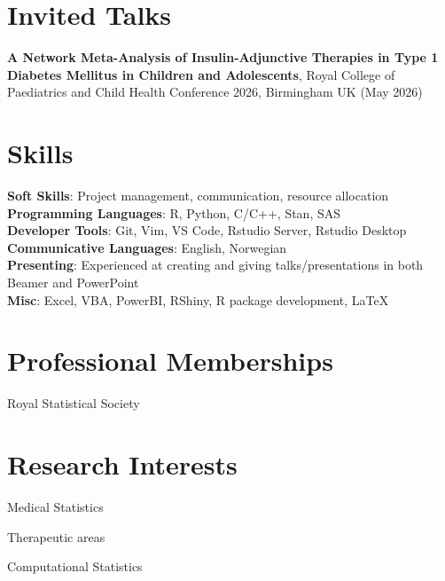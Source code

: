 \documentclass[letterpaper,11pt]{article}
\begin{document}
\section{Invited Talks}
\begin{itemize}[leftmargin=0.15in, label={}]
    \small{
      \item{\textbf{A Network Meta-Analysis of Insulin-Adjunctive Therapies in Type 1 Diabetes Mellitus in Children and Adolescents}, Royal College of Paediatrics and Child Health Conference 2026, Birmingham UK  (May 2026)}
    }
\end{itemize}

\section{Skills}
 \begin{itemize}[leftmargin=0.15in, label={}]
    \small{\item{
     \textbf{Soft Skills}{: Project management, communication, resource allocation} \\
     \textbf{Programming Languages}{: R, Python, C/C++, Stan, SAS} \\
     \textbf{Developer Tools}{: Git, Vim,  VS Code, Rstudio Server, Rstudio Desktop} \\
     \textbf{Communicative Languages}: English, Norwegian \\
     \textbf{Presenting}{: Experienced at creating and giving talks/presentations in both Beamer and PowerPoint} \\
    \textbf{Misc}{: Excel, VBA, PowerBI, RShiny, R package development, \LaTeX}
    }}
\end{itemize}

\section{Professional Memberships}
\begin{itemize}[leftmargin=0.15in, label={}]
    \small{\item Royal Statistical Society}
\end{itemize}

\section{Research Interests}
\begin{itemize}[leftmargin=0.15in, label={}]
    \small{\item{{Medical Statistics}} \\
           \item{{Therapeutic areas}} \\
           \item{{Computational Statistics}}} \\
\end{itemize}


\end{document}

